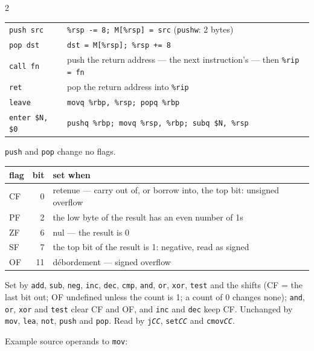 \begin{multicols}{2}
\begin{tabularx}{\linewidth}{@{}lX@{}}
\texttt{push src} & \texttt{\%rsp -= 8; M[\%rsp] = src} (\texttt{pushw}: 2 bytes) \\
\texttt{pop dst} & \texttt{dst = M[\%rsp]; \%rsp += 8} \\
\texttt{call fn} & push the return address --- the next instruction's --- then \texttt{\%rip = fn} \\
\texttt{ret} & pop the return address into \texttt{\%rip} \\
\texttt{leave} & \texttt{movq \%rbp, \%rsp; popq \%rbp} \\
\texttt{enter \$N, \$0} & \texttt{pushq \%rbp; movq \%rsp, \%rbp; subq \$N, \%rsp} \\
\end{tabularx}\par\smallskip
\texttt{push} and \texttt{pop} change no flags.

\begin{tabularx}{\linewidth}{@{}lrX@{}}
\toprule
flag & bit & set when \\
\midrule
CF & 0  & retenue --- carry out of, or borrow into, the top bit: unsigned overflow \\
PF & 2  & the low byte of the result has an even number of 1s \\
ZF & 6  & nul --- the result is 0 \\
SF & 7  & the top bit of the result is 1: negative, read as signed \\
OF & 11 & débordement --- signed overflow \\
\bottomrule
\end{tabularx}
Set by \texttt{add}, \texttt{sub}, \texttt{neg}, \texttt{inc}, \texttt{dec},
\texttt{cmp}, \texttt{and}, \texttt{or}, \texttt{xor}, \texttt{test} and the shifts
(CF = the last bit out; OF undefined unless the count is 1; a count of 0 changes none);
\texttt{and}, \texttt{or}, \texttt{xor} and \texttt{test} clear CF and OF, and
\texttt{inc} and \texttt{dec} keep CF. Unchanged by \texttt{mov}, \texttt{lea},
\texttt{not}, \texttt{push} and \texttt{pop}. Read by \texttt{j\textit{CC\nocorr}},
\texttt{set\textit{CC\nocorr}} and \texttt{cmov\textit{CC\nocorr}}.

Example source operands to \texttt{mov}:


\end{multicols}
